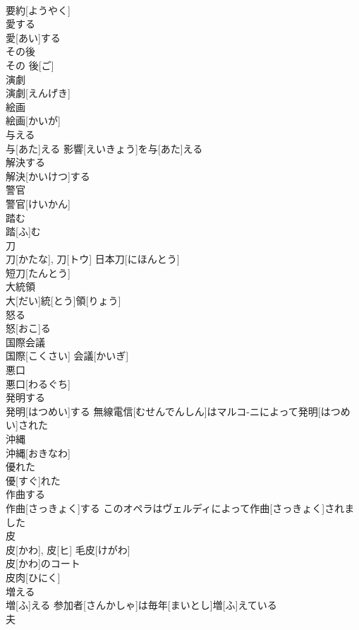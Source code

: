 \documentclass[8pt]{extreport}
\begin{document}
\begin{CJK}{UTF8}{min}
\\	要約[ようやく]	
\\	愛する	
\\	愛[あい]する	
\\	その後	
\\	その 後[ご]	
\\	演劇	
\\	演劇[えんげき]	
\\	絵画	
\\	絵画[かいが]	
\\	与える	
\\	与[あた]える	影響[えいきょう]を与[あた]える 
\\	解決する	
\\	解決[かいけつ]する	
\\	警官	
\\	警官[けいかん]	
\\	踏む	
\\	踏[ふ]む	
\\	刀	
\\	刀[かたな], 刀[トウ]	日本刀[にほんとう] 
\\	短刀[たんとう] 
\\	大統領	
\\	大[だい]統[とう]領[りょう]	
\\	怒る	
\\	怒[おこ]る	
\\	国際会議	
\\	国際[こくさい] 会議[かいぎ]	
\\	悪口	
\\	悪口[わるぐち]	
\\	発明する	
\\	発明[はつめい]する	無線電信[むせんでんしん]はマルコ-ニによって発明[はつめい]された　
\\	沖縄	
\\	沖縄[おきなわ]	
\\	優れた	
\\	優[すぐ]れた	
\\	作曲する	
\\	作曲[さっきょく]する	このオペラはヴェルディによって作曲[さっきょく]されました 
\\	皮	
\\	皮[かわ], 皮[ヒ]	毛皮[けがわ] 
\\	皮[かわ]のコート 
\\	皮肉[ひにく] 
\\	増える	
\\	増[ふ]える	参加者[さんかしゃ]は毎年[まいとし]増[ふ]えている 
\\	夫	

\end{CJK}
\end{document}
